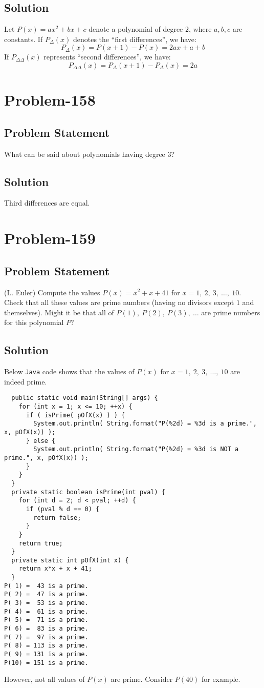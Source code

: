 \documentclass[12pt]{article}
\begin{document}
\subsection*{Solution}
Let $P(x) = ax^2 + bx + c$ denote a polynomial of degree $2$, where $a, b, c$ are constants. If $P_{\Delta}(x)$ denotes the ``first differences'', we have:
\[
	P_{\Delta}(x) = P(x+1)-P(x) = 2ax + a+b
\]
If $P_{\Delta \Delta}(x)$ represents ``second differences'', we have:
\[
	P_{\Delta \Delta}(x) = P_{\Delta}(x+1) - P_{\Delta}(x) = 2a
\]

\section*{Problem-158}
\subsection*{Problem Statement}
What can be said about polynomials having degree $3$?
\subsection*{Solution}
Third differences are equal.

\section*{Problem-159}
\subsection*{Problem Statement}
(L. Euler) Compute the values $P(x) = x^2+x+41$ for $x=1,\ 2,\ 3,\ \ldots,\ 10$. Check that all these values are prime numbers (having no divisors except $1$ and themselves). Might it be that all of $P(1),\ P(2),\ P(3),\ \ldots$ are prime numbers for this polynomial $P$?
\subsection*{Solution}
Below {\tt Java} code shows that the values of $P(x)$ for $x=1,\ 2,\ 3,\ \ldots,\ 10$ are indeed prime.
\begin{verbatim}
  public static void main(String[] args) {
    for (int x = 1; x <= 10; ++x) {
      if ( isPrime( pOfX(x) ) ) {
        System.out.println( String.format("P(%2d) = %3d is a prime.", x, pOfX(x)) );
      } else {
        System.out.println( String.format("P(%2d) = %3d is NOT a prime.", x, pOfX(x)) );
      }
    }
  }
  private static boolean isPrime(int pval) {
    for (int d = 2; d < pval; ++d) {
      if (pval % d == 0) {
        return false;
      }
    }
    return true;
  }
  private static int pOfX(int x) {
    return x*x + x + 41;
  }
P( 1) =  43 is a prime.
P( 2) =  47 is a prime.
P( 3) =  53 is a prime.
P( 4) =  61 is a prime.
P( 5) =  71 is a prime.
P( 6) =  83 is a prime.
P( 7) =  97 is a prime.
P( 8) = 113 is a prime.
P( 9) = 131 is a prime.
P(10) = 151 is a prime.
\end{verbatim}
However, not all values of $P(x)$ are prime. Consider $P(40)$ for example.
\end{document}
